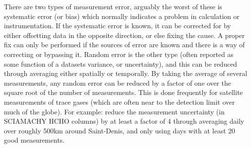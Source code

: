       There are two types of measurement error, arguably the worst of these is systematic error (or bias) which normally indicates a problem in calculation or instrumentation.
      If the systematic error is known, it can be corrected for by either offsetting data in the opposite direction, or else fixing the cause.
      A proper fix can only be performed if the sources of error are known and there is a way of correcting or bypassing it.
      Random error is the other type (often reported as some function of a datasets variance, or uncertainty), and this can be reduced through averaging either spatially or temporally. 
      By taking the average of several measurements, any random error can be reduced by a factor of one over the square root of the number of measurements.
      This is done frequently for satellite measurements of trace gases (which are often near to the detection limit over much of the globe).
      For example: \textcite{Vigouroux2009} reduce the measurement uncertainty (in SCIAMACHY HCHO columns) by at least a factor of 4 through averaging daily over roughly 500km around Saint-Denis, and only using days with at least 20 good measurements.
      
